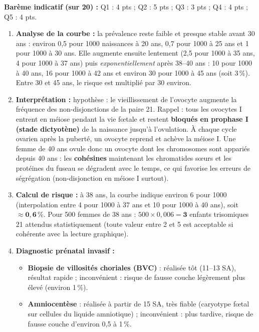 \documentclass[11pt]{article}
\begin{document}
\begin{corrige}
\textbf{Barème indicatif (sur 20) :} Q1 : 4 pts ; Q2 : 5 pts ; Q3 : 3 pts ; Q4 : 4 pts ; Q5 : 4 pts.
\begin{enumerate}
    \item \textbf{Analyse de la courbe :} la prévalence reste faible et presque stable avant 30 ans : environ 0,5 pour 1000 naissances à 20 ans, 0,7 pour 1000 à 25 ans et 1 pour 1000 à 30 ans. Elle augmente ensuite lentement (2,5 pour 1000 à 35 ans, 4 pour 1000 à 37 ans) puis \emph{exponentiellement} après 38--40 ans : 10 pour 1000 à 40 ans, 16 pour 1000 à 42 ans et environ 30 pour 1000 à 45 ans (soit 3\,\%). Entre 30 et 45 ans, le risque est multiplié par 30 environ.
    \item \textbf{Interprétation :} hypothèse : le vieillissement de l'ovocyte augmente la fréquence des non-disjonctions de la paire 21. Rappel : tous les ovocytes I entrent en méiose pendant la vie fœtale et restent \textbf{bloqués en prophase I (stade dictyotène)} de la naissance jusqu'à l'ovulation. À chaque cycle ovarien après la puberté, un ovocyte reprend et achève la méiose I. Une femme de 40 ans ovule donc un ovocyte dont les chromosomes sont appariés depuis 40 ans : les \textbf{cohésines} maintenant les chromatides sœurs et les protéines du fuseau se dégradent avec le temps, ce qui favorise les erreurs de ségrégation (non-disjonction en méiose I surtout).
    \item \textbf{Calcul de risque :} à 38 ans, la courbe indique environ 6 pour 1000 (interpolation entre 4 pour 1000 à 37 ans et 10 pour 1000 à 40 ans), soit $\approx \mathbf{0,6\,\%}$. Pour 500 femmes de 38 ans : $500 \times 0{,}006 = \mathbf{3}$ enfants trisomiques 21 attendus statistiquement (toute valeur entre 2 et 5 est acceptable si cohérente avec la lecture graphique).
    \item \textbf{Diagnostic prénatal invasif :}
    \begin{itemize}
        \item \textbf{Biopsie de villosités choriales (BVC)} : réalisée tôt (11--13 SA), résultat rapide ; inconvénient : risque de fausse couche légèrement plus élevé (environ 1\,\%).
        \item \textbf{Amniocentèse} : réalisée à partir de 15 SA, très fiable (caryotype fœtal sur cellules du liquide amniotique) ; inconvénient : plus tardive, risque de fausse couche d'environ 0,5 à 1\,\%.
    \end{itemize}

\end{enumerate}
\end{corrige}
\end{document}
